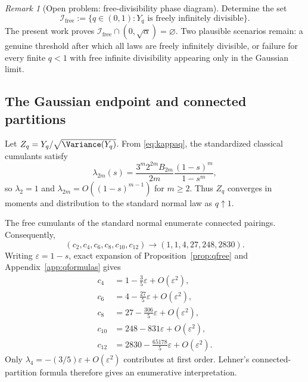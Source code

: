 \documentclass[11pt,oneside]{article}
\theoremstyle{definition}
\theoremstyle{remark}
\newtheorem{remark}[theorem]{Remark}
\newcommand{\FreeIDParameterSet}{\mathcal{I}_{\mathrm{free}}}
\begin{document}
\begin{remark}[Open problem: free-divisibility phase diagram]\label{prob:phase}
Determine the set
\[
\FreeIDParameterSet:=\{q\in(0,1):Y_q\text{ is freely infinitely divisible}\}.
\]
The present work proves \(\FreeIDParameterSet\cap(0,\sqrt\alpha)=\varnothing\). Two plausible scenarios remain: a genuine threshold after which all laws are freely infinitely divisible, or failure for every finite \(q<1\) with free infinite divisibility appearing only in the Gaussian limit.
\end{remark}

\subsection{The Gaussian endpoint and connected partitions}
Let \(Z_q=Y_q/\sqrt{\Variance(Y_q)}\). From \eqref{eq:kappaq}, the standardized classical cumulants satisfy
\begin{equation}\label{eq:stdclassical}
\lambda_{2m}(s)=
\frac{3^m2^{2m}B_{2m}}{2m}\frac{(1-s)^m}{1-s^m},
\end{equation}
so \(\lambda_2=1\) and \(\lambda_{2m}=O((1-s)^{m-1})\) for \(m\ge2\). Thus \(Z_q\) converges in moments and distribution to the standard normal law as \(q\uparrow1\).

The free cumulants of the standard normal enumerate connected pairings. Consequently,
\begin{equation}\label{eq:normalfree}
(c_2,c_4,c_6,c_8,c_{10},c_{12})\longrightarrow(1,1,4,27,248,2830).
\end{equation}
Writing \(\varepsilon=1-s\), exact expansion of Proposition~\ref{prop:qfree} and Appendix~\ref{app:qformulas} gives
\begin{align}
c_4&=1-\frac35\varepsilon+O(\varepsilon^2),\nonumber\\
c_6&=4-\frac{27}{5}\varepsilon+O(\varepsilon^2),\nonumber\\
c_8&=27-\frac{306}{5}\varepsilon+O(\varepsilon^2),\label{eq:gausscorrections}\\
c_{10}&=248-831\varepsilon+O(\varepsilon^2),\nonumber\\
c_{12}&=2830-\frac{65178}{5}\varepsilon+O(\varepsilon^2).\nonumber
\end{align}
Only \(\lambda_4=-(3/5)\varepsilon+O(\varepsilon^2)\) contributes at first order. Lehner's connected-partition formula therefore gives an enumerative interpretation.
\end{document}

